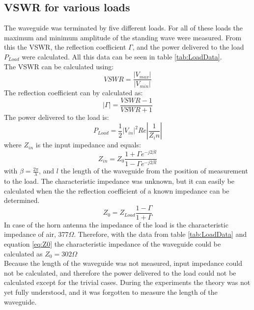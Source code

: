 \documentclass[11pt,a4paper]{article}
\begin{document}
\subsection{VSWR for various loads}
The waveguide was terminated by five different loads. For all of these loads the maximum and minimum amplitude of the standing wave were measured. From this the VSWR, the reflection coefficient $\Gamma$, and the power delivered to the load $P_{Load}$ were calculated. All this data can be seen in table \ref{tab:LoadData}.\\
The VSWR can be calculated using:
\begin{equation}
\label{eq:VSWR}
VSWR = \frac{|V_{max}|}{|V_{min}|}
\end{equation}
The reflection coefficient can by calculated as:
\begin{equation}
\label{eq:Gamma}
|\Gamma| = \frac{VSWR - 1}{VSWR + 1}
\end{equation}
The power delivered to the load is:
\begin{equation}
\label{eq:PLoad}
P_{Load}=\frac{1}{2}|V_{in}|^{2}Re|\frac{1}{Z_in}|
\end{equation}
where $Z_{in}$ is the input impedance and equals: 
\begin{equation}
\label{eq:Zin}
Z_{in}=Z_{0}\frac{1+\Gamma e^{-j2\beta l}}{1-\Gamma e^{-j2\beta l}}
\end{equation}
with $\beta = \frac{2\pi}{\lambda}$, and $l$ the length of the waveguide from the position of measurement to the load. The characteristic impedance was unknown, but it can easily be calculated when the the reflection coefficient of a known impedance can be determined.
\begin{equation}
\label{eq:Z0}
Z_{0}= Z_{Load}\frac{1-\Gamma}{1+\Gamma}
\end{equation}
In case of the horn antenna the impedance of the load is the characteristic impedance of air, 377$\Omega$. Therefore, with the data from table \ref{tab:LoadData} and equation \ref{eq:Z0} the characteristic impedance of the waveguide could be calculated as $Z_{0}=302\Omega$\\
Because the length of the waveguide was not measured, input impedance could not be calculated, and therefore the power delivered to the load could not be calculated except for the trivial cases. During the experiments the theory was not yet fully understood, and it was forgotten to measure the length of the waveguide.
\end{document}
